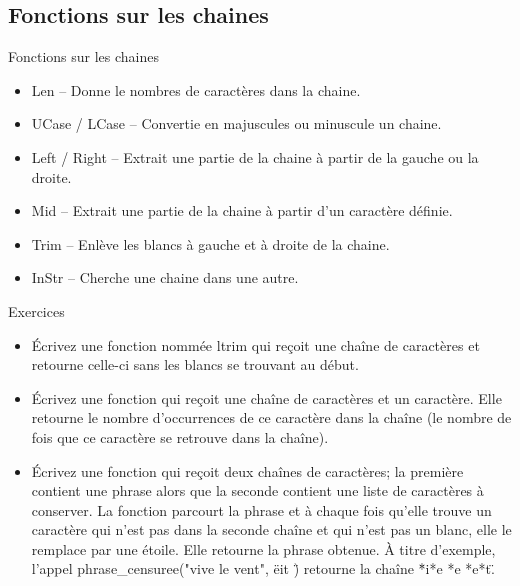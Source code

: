 \documentclass[aspectratio=169,usenames,dvipsnames]{beamer}
\begin{document}
    \subsection{Fonctions sur les chaines}
    \begin{frame}{Fonctions sur les chaines}
        \begin{itemize}
            \item \alert{Len} – Donne le nombres de caractères dans la chaine.
            \item \alert{UCase} / \alert{LCase} – Convertie en majuscules ou minuscule un chaine.
            \item \alert{Left} / \alert{Right} – Extrait une partie de la chaine à partir de la gauche ou la droite.
            \item \alert{Mid} – Extrait une partie de la chaine à partir d’un caractère définie.
            \item \alert{Trim} – Enlève les blancs à gauche et à droite de la chaine.
            \item \alert{InStr} – Cherche une chaine dans une autre.

        \end{itemize}
    \end{frame}
    \begin{frame}{Exercices}
        \begin{itemize}
            \item Écrivez une fonction nommée ltrim qui reçoit une chaîne de caractères et retourne celle-ci sans les blancs se trouvant au début.
            \item Écrivez une fonction qui reçoit une chaîne de caractères et un caractère. Elle retourne le nombre d'occurrences de ce caractère dans la chaîne (le nombre de fois que ce caractère se retrouve dans la chaîne).
            \item Écrivez une fonction qui reçoit deux chaînes de caractères; la première contient une phrase alors que la seconde contient une liste de caractères à conserver. La fonction parcourt la phrase et à chaque fois qu'elle trouve un caractère qui n'est pas dans la seconde chaîne et qui n'est pas un blanc, elle le remplace par une étoile. Elle retourne la phrase obtenue.
                    À titre d'exemple, l'appel phrase\_censuree("vive le vent", \"eit \") retourne la chaîne \"*i*e *e *e*t\".

        \end{itemize}
    \end{frame}
\end{document}
